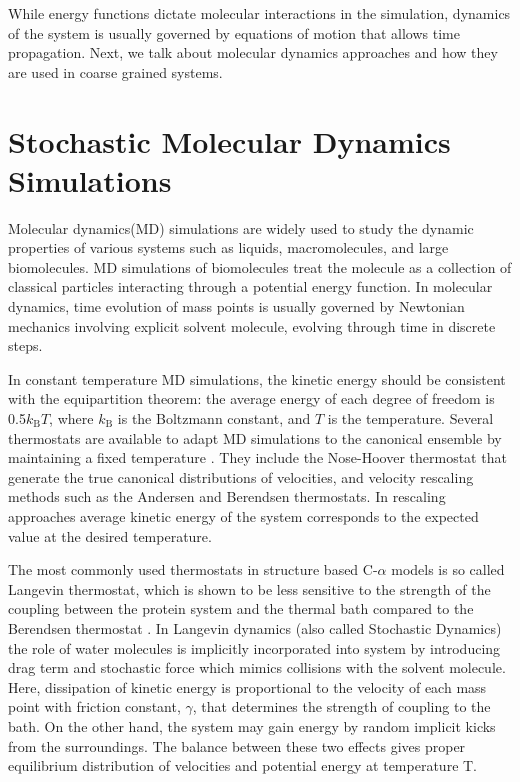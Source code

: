 \documentclass[../talant.diss.submit.tex]{subfiles}
\begin{document}
While energy functions dictate molecular interactions in the simulation, dynamics of the system
is usually governed by equations of motion that allows time propagation. Next, we talk about
molecular dynamics approaches and how they are used in coarse grained systems. 


%
\section{\textbf{Stochastic Molecular Dynamics Simulations}}\label{sect:two_seven}
%
Molecular dynamics(MD) simulations are widely used to study the dynamic properties of various systems
such as liquids, macromolecules, and large biomolecules.
MD simulations of biomolecules treat the molecule as a collection of classical particles interacting through
a potential energy function.
In molecular dynamics, time evolution of mass points is usually governed by Newtonian 
mechanics involving explicit solvent molecule, evolving through time in discrete steps.

In constant temperature MD simulations, the kinetic energy should be consistent with the equipartition theorem:
the average energy of each degree of freedom is 0.5$k_{\mathrm{B}}T$, where $k_{\mathrm{B}}$ is the Boltzmann constant, and $T$ is the temperature. 
Several thermostats are available to adapt MD simulations to the canonical ensemble
by maintaining a fixed temperature \cite{hunenberger:05a}. 
They include the Nose-Hoover thermostat that generate the true canonical distributions of
velocities, and velocity rescaling methods such as the Andersen and Berendsen
\cite{berendsen:84h}
thermostats. In rescaling approaches average kinetic energy of the system corresponds to the
expected value at the desired temperature. 

The most commonly used thermostats in structure based C-$\alpha$ models is so called
Langevin thermostat, which is shown to be less sensitive to the strength of the coupling
between the protein system and the thermal bath compared to the Berendsen thermostat
\cite{mor:08s}. 
In  Langevin dynamics (also called Stochastic Dynamics) the  role of water molecules is implicitly
incorporated into system 
by introducing drag term and stochastic force which mimics collisions with the solvent molecule.\cite{pastor:94t}
Here, dissipation of kinetic energy is proportional to the velocity of each
mass point with friction constant, $\gamma$, that determines the strength of coupling to the bath.
On the other hand, the system may gain energy by random implicit kicks from the surroundings.
The balance between these two effects gives proper equilibrium distribution of velocities and potential
energy at temperature T.
\end{document}
